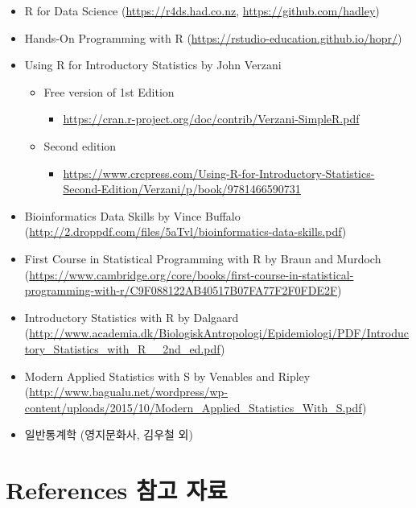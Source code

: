 \documentclass[
]{book}
\providecommand{\tightlist}{%
  \setlength{\itemsep}{0pt}\setlength{\parskip}{0pt}}
\begin{document}
\begin{itemize}
\tightlist
\item
  R for Data Science (\url{https://r4ds.had.co.nz}, \url{https://github.com/hadley})
\item
  Hands-On Programming with R (\url{https://rstudio-education.github.io/hopr/})
\item
  Using R for Introductory Statistics by John Verzani

  \begin{itemize}
  \tightlist
  \item
    Free version of 1st Edition

    \begin{itemize}
    \tightlist
    \item
      \url{https://cran.r-project.org/doc/contrib/Verzani-SimpleR.pdf}
    \end{itemize}
  \item
    Second edition

    \begin{itemize}
    \tightlist
    \item
      \url{https://www.crcpress.com/Using-R-for-Introductory-Statistics-Second-Edition/Verzani/p/book/9781466590731}
    \end{itemize}
  \end{itemize}
\item
  Bioinformatics Data Skills by Vince Buffalo (\url{http://2.droppdf.com/files/5aTvl/bioinformatics-data-skills.pdf})
\item
  First Course in Statistical Programming with R by Braun and
  Murdoch (\url{https://www.cambridge.org/core/books/first-course-in-statistical-programming-with-r/C9F088122AB40517B07FA77F2F0FDE2F})
\item
  Introductory Statistics with R by Dalgaard (\url{http://www.academia.dk/BiologiskAntropologi/Epidemiologi/PDF/Introductory_Statistics_with_R__2nd_ed.pdf})
\item
  Modern Applied Statistics with S by Venables and Ripley (\url{http://www.bagualu.net/wordpress/wp-content/uploads/2015/10/Modern_Applied_Statistics_With_S.pdf})
\item
  일반통계학 (영지문화사, 김우철 외)
\end{itemize}

\hypertarget{references-uxcc38uxace0-uxc790uxb8cc}{%
\section{References 참고 자료}\label{references-uxcc38uxace0-uxc790uxb8cc}}
\end{document}
